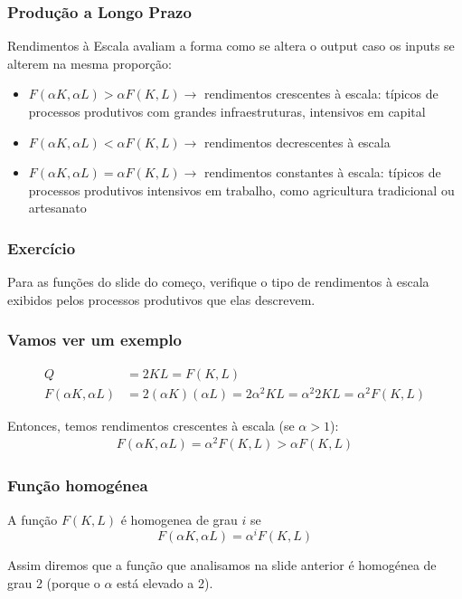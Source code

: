 \begin{frame}
	\frametitle{Produ\c c\~ao a Longo Prazo}
	Rendimentos \`a Escala avaliam a forma como se altera o output caso os inputs se alterem na mesma propor\c c\~ao:
	\begin{itemize}
		\item \(F(\alpha K,\alpha L)>\alpha F(K,L)\rightarrow\) rendimentos crescentes \`a escala: t\'ipicos de processos produtivos com grandes infraestruturas, intensivos em capital
		\item \(F(\alpha K,\alpha L)<\alpha F(K,L)\rightarrow\) rendimentos decrescentes \`a escala
		\item \(F(\alpha K,\alpha L)=\alpha F(K,L)\rightarrow\) rendimentos constantes \`a escala: t\'ipicos de processos produtivos intensivos em trabalho, como agricultura tradicional ou artesanato
	\end{itemize}
\end{frame}

\begin{frame}
	\frametitle{Exerc\'icio}
	Para as fun\c c\~oes do slide do come\c co, verifique o tipo de rendimentos \`a escala exibidos pelos processos produtivos que elas descrevem.
\end{frame}

\begin{frame}
	\frametitle{Vamos ver um exemplo}
	\begin{align*}
		Q&=2KL=F(K,L)\\
		F(\alpha K,\alpha L) &= 2 (\alpha K) (\alpha L) = 2 \alpha^2 KL = \alpha^2 2KL = \alpha^2 F(K,L)
	\end{align*}

	Entonces, temos rendimentos crescentes \`a escala (se $\alpha > 1$):
	\begin{align*}
		F(\alpha K, \alpha L) = \alpha^2 F(K,L) > \alpha F(K,L)
	\end{align*}
\end{frame}

\begin{frame}
	\frametitle{Fun\c c\~ao homog\'enea}
	\begin{tcolorbox}[title=Homogeneidade de uma fun\c c\~ao,colback=green!30!white,colframe=green!60!black]
	A fun\c c\~ao $F(K,L)$ \'e homogenea de grau $i$ se \[F(\alpha K,\alpha L)=\alpha^i F(K,L)\]
	\end{tcolorbox}

	Assim diremos que a fun\c c\~ao que analisamos na slide anterior \'e homog\'enea de grau 2 (porque o $\alpha$ est\'a elevado a 2).
\end{frame}